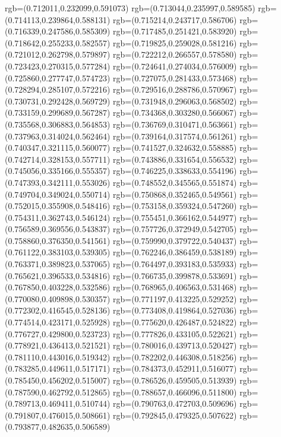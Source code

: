 {{{			rgb=(0.712011,0.232099,0.591073)
			rgb=(0.713044,0.235997,0.589585)
			rgb=(0.714113,0.239864,0.588131)
			rgb=(0.715214,0.243717,0.586706)
			rgb=(0.716339,0.247586,0.585309)
			rgb=(0.717485,0.251421,0.583920)
			rgb=(0.718642,0.255233,0.582557)
			rgb=(0.719825,0.259028,0.581216)
			rgb=(0.721012,0.262798,0.579897)
			rgb=(0.722212,0.266557,0.578580)
			rgb=(0.723423,0.270315,0.577284)
			rgb=(0.724641,0.274034,0.576009)
			rgb=(0.725860,0.277747,0.574723)
			rgb=(0.727075,0.281433,0.573468)
			rgb=(0.728294,0.285107,0.572216)
			rgb=(0.729516,0.288786,0.570967)
			rgb=(0.730731,0.292428,0.569729)
			rgb=(0.731948,0.296063,0.568502)
			rgb=(0.733159,0.299689,0.567287)
			rgb=(0.734368,0.303280,0.566067)
			rgb=(0.735568,0.306883,0.564853)
			rgb=(0.736769,0.310471,0.563661)
			rgb=(0.737963,0.314024,0.562464)
			rgb=(0.739164,0.317574,0.561261)
			rgb=(0.740347,0.321115,0.560077)
			rgb=(0.741527,0.324632,0.558885)
			rgb=(0.742714,0.328153,0.557711)
			rgb=(0.743886,0.331654,0.556532)
			rgb=(0.745056,0.335166,0.555357)
			rgb=(0.746225,0.338633,0.554196)
			rgb=(0.747393,0.342111,0.553026)
			rgb=(0.748552,0.345565,0.551874)
			rgb=(0.749704,0.349024,0.550714)
			rgb=(0.750868,0.352465,0.549561)
			rgb=(0.752015,0.355908,0.548416)
			rgb=(0.753158,0.359324,0.547260)
			rgb=(0.754311,0.362743,0.546124)
			rgb=(0.755451,0.366162,0.544977)
			rgb=(0.756589,0.369556,0.543837)
			rgb=(0.757726,0.372949,0.542705)
			rgb=(0.758860,0.376350,0.541561)
			rgb=(0.759990,0.379722,0.540437)
			rgb=(0.761122,0.383103,0.539305)
			rgb=(0.762246,0.386459,0.538189)
			rgb=(0.763371,0.389823,0.537065)
			rgb=(0.764497,0.393183,0.535933)
			rgb=(0.765621,0.396533,0.534816)
			rgb=(0.766735,0.399878,0.533691)
			rgb=(0.767850,0.403228,0.532586)
			rgb=(0.768965,0.406563,0.531468)
			rgb=(0.770080,0.409898,0.530357)
			rgb=(0.771197,0.413225,0.529252)
			rgb=(0.772302,0.416545,0.528136)
			rgb=(0.773408,0.419864,0.527036)
			rgb=(0.774514,0.423171,0.525928)
			rgb=(0.775620,0.426487,0.524822)
			rgb=(0.776727,0.429800,0.523723)
			rgb=(0.777826,0.433105,0.522621)
			rgb=(0.778921,0.436413,0.521521)
			rgb=(0.780016,0.439713,0.520427)
			rgb=(0.781110,0.443016,0.519342)
			rgb=(0.782202,0.446308,0.518256)
			rgb=(0.783285,0.449611,0.517171)
			rgb=(0.784373,0.452911,0.516077)
			rgb=(0.785450,0.456202,0.515007)
			rgb=(0.786526,0.459505,0.513939)
			rgb=(0.787590,0.462792,0.512865)
			rgb=(0.788657,0.466096,0.511800)
			rgb=(0.789713,0.469411,0.510744)
			rgb=(0.790763,0.472703,0.509696)
			rgb=(0.791807,0.476015,0.508661)
			rgb=(0.792845,0.479325,0.507622)
			rgb=(0.793877,0.482635,0.506589)
}}}
